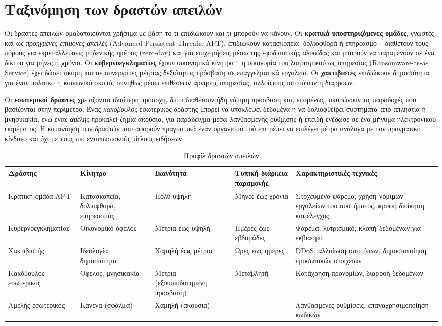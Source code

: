 \section{Ταξινόμηση των δραστών απειλών}\label{sec:3.1}
Οι δράστες απειλών ομαδοποιούνται χρήσιμα με βάση το τι επιδιώκουν και τι μπορούν να κάνουν. Οι \textbf{κρατικά υποστηριζόμενες ομάδες}, γνωστές και ως \emph{προηγμένες επίμονες απειλές} (Advanced Persistent Threats, APT), επιδιώκουν κατασκοπεία, δολιοφθορά ή επηρεασμό· διαθέτουν τους πόρους για εκμεταλλεύσεις μηδενικής ημέρας (zero-day) και για επιχειρήσεις μέσω της εφοδιαστικής αλυσίδας και μπορούν να παραμένουν σε ένα δίκτυο για μήνες ή χρόνια. Οι \textbf{κυβερνοεγκληματίες} έχουν οικονομικά κίνητρα· η οικονομία του λυτρισμικού ως υπηρεσίας (Ransomware-as-a-Service) έχει δώσει ακόμη και σε συνεργάτες μέτριας δεξιότητας πρόσβαση σε επαγγελματικά εργαλεία. Οι \textbf{χακτιβιστές} επιδιώκουν δημοσιότητα για έναν πολιτικό ή κοινωνικό σκοπό, συνήθως μέσω επιθέσεων άρνησης υπηρεσίας, αλλοίωσης ιστοτόπων ή διαρροών.

Οι \textbf{εσωτερικοί δράστες} χρειάζονται ιδιαίτερη προσοχή, διότι διαθέτουν ήδη νόμιμη πρόσβαση και, επομένως, ακυρώνουν τις παραδοχές που βασίζονται στην περίμετρο. Ένας \emph{κακόβουλος} εσωτερικός δράστης μπορεί να υποκλέψει δεδομένα ή να δολιοφθείρει συστήματα από απληστία ή μνησικακία, ενώ ένας \emph{αμελής} προκαλεί ζημιά ακούσια, για παράδειγμα μέσω λανθασμένης ρύθμισης ή επειδή ενέδωσε σε ένα μήνυμα ηλεκτρονικού ψαρέματος. Η κατανόηση των δραστών που αφορούν πραγματικά έναν οργανισμό τού επιτρέπει να επιλέγει μέτρα ανάλογα με τον πραγματικό κίνδυνο και όχι με τους πιο εντυπωσιακούς τίτλους ειδήσεων.

\begin{table}[htbp]
  \centering\small
  \caption{Προφίλ δραστών απειλών}
  \begin{tabularx}{\linewidth}{>{\raggedright\arraybackslash}X >{\raggedright\arraybackslash}X >{\raggedright\arraybackslash}X >{\raggedright\arraybackslash}X >{\raggedright\arraybackslash}X}
    \toprule
    \textbf{Δράστης} & \textbf{Κίνητρο} & \textbf{Ικανότητα} & \textbf{Τυπική διάρκεια παραμονής} & \textbf{Χαρακτηριστικές τεχνικές} \\
    \midrule
    Κρατική ομάδα APT & Κατασκοπεία, δολιοφθορά, επηρεασμός & Πολύ υψηλή & Μήνες έως χρόνια & Στοχευμένο ψάρεμα, χρήση νόμιμων εργαλείων του συστήματος, κρυφή διοίκηση και έλεγχος \\
    Κυβερνοεγκληματίας & Οικονομικό όφελος & Μέτρια έως υψηλή & Ημέρες έως εβδομάδες & Ψάρεμα, λυτρισμικό, κλοπή δεδομένων για εκβιασμό \\
    Χακτιβιστής & Ιδεολογία, δημοσιότητα & Χαμηλή έως μέτρια & Ώρες έως ημέρες & DDoS, αλλοίωση ιστοτόπων, δημοσιοποίηση προσωπικών στοιχείων \\
    Κακόβουλος εσωτερικός & Όφελος, μνησικακία & Μέτρια (εξουσιοδοτημένη πρόσβαση) & Μεταβλητή & Κατάχρηση προνομίων, διαρροή δεδομένων \\
    Αμελής εσωτερικός & Κανένα (σφάλμα) & Χαμηλή (ακούσια) & — & Λανθασμένες ρυθμίσεις, επαναχρησιμοποίηση κωδικών \\
    \bottomrule
  \end{tabularx}
\end{table}
